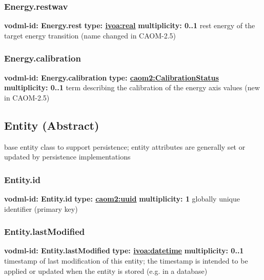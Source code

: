     \subsubsection{Energy.restwav}
      \textbf{vodml-id: Energy.rest} \newline
      \textbf{type: \hyperref[sect:ivoa]{ivoa:real}} \newline
      \textbf{multiplicity: 0..1} \newline
      rest energy of the target energy transition (name changed in CAOM-2.5)

    \subsubsection{Energy.calibration}
      \textbf{vodml-id: Energy.calibration} \newline
      \textbf{type: \hyperref[sect:CalibrationStatus]{caom2:CalibrationStatus}} \newline
      \textbf{multiplicity: 0..1} \newline
      term describing the calibration of the energy axis values (new in CAOM-2.5)

  \subsection{Entity (Abstract)}
  \label{sect:Entity}
    base entity class to support persistence; entity attributes are generally set or updated by persistence implementations

    \subsubsection{Entity.id}
      \textbf{vodml-id: Entity.id} \newline
      \textbf{type: \hyperref[sect:uuid]{caom2:uuid}} \newline
      \textbf{multiplicity: 1} \newline
      globally unique identifier (primary key)

    \subsubsection{Entity.lastModified}
      \textbf{vodml-id: Entity.lastModified} \newline
      \textbf{type: \hyperref[sect:ivoa]{ivoa:datetime}} \newline
      \textbf{multiplicity: 0..1} \newline
      timestamp of last modification of this entity; the timestamp is intended to be applied or updated when the entity is stored (e.g. in a database)

